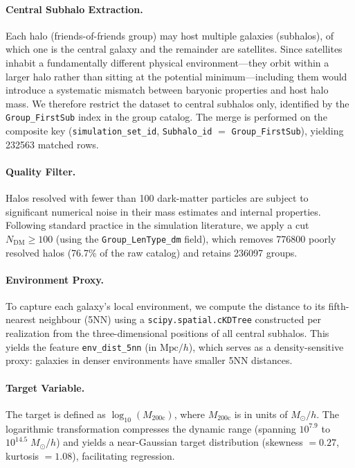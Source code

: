 \documentclass[12pt, a4paper]{article}
\newcommand{\logMhalo}{\log_{10}(M_{200\mathrm{c}})}
\newcommand{\Msun}{M_\odot}
\begin{document}
\paragraph{Central Subhalo Extraction.}
Each halo (friends-of-friends group) may host multiple galaxies (subhalos), of which one is the central galaxy and the remainder are satellites.  Since satellites inhabit a fundamentally different physical environment---they orbit within a larger halo rather than sitting at the potential minimum---including them would introduce a systematic mismatch between baryonic properties and host halo mass.  We therefore restrict the dataset to central subhalos only, identified by the \texttt{Group\_FirstSub} index in the group catalog.  The merge is performed on the composite key (\texttt{simulation\_set\_id}, \texttt{Subhalo\_id} $=$ \texttt{Group\_FirstSub}), yielding \num{232563} matched rows.

\paragraph{Quality Filter.}
Halos resolved with fewer than 100 dark-matter particles are subject to significant numerical noise in their mass estimates and internal properties.  Following standard practice in the simulation literature, we apply a cut $N_{\mathrm{DM}} \geq 100$ (using the \texttt{Group\_LenType\_dm} field), which removes \num{776800} poorly resolved halos (76.7\% of the raw catalog) and retains \num{236097} groups.

\paragraph{Environment Proxy.}
To capture each galaxy's local environment, we compute the distance to its fifth-nearest neighbour (5NN) using a \texttt{scipy.spatial.cKDTree} constructed per realization from the three-dimensional positions of all central subhalos.  This yields the feature \texttt{env\_dist\_5nn} (in $\mathrm{Mpc}/h$), which serves as a density-sensitive proxy: galaxies in denser environments have smaller 5NN distances.

\paragraph{Target Variable.}
The target is defined as $\logMhalo$, where $M_{200\mathrm{c}}$ is in units of $\Msun/h$.  The logarithmic transformation compresses the dynamic range (spanning $10^{7.9}$ to $10^{14.5}\;\Msun/h$) and yields a near-Gaussian target distribution (skewness $= 0.27$, kurtosis $= 1.08$), facilitating regression.
\end{document}

